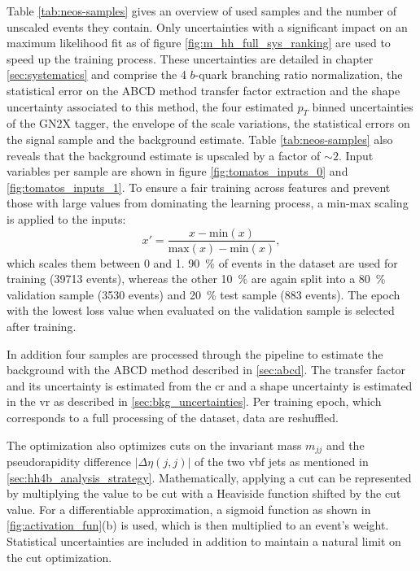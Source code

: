 Table \ref{tab:neos-samples} gives an overview of used samples and the number of unscaled events they contain. Only uncertainties with a significant impact on an \mhh{} maximum likelihood fit as of figure \ref{fig:m_hh_full_sys_ranking} are used to speed up the training process. These uncertainties are detailed in chapter \ref{sec:systematics} and comprise the 4 $b$-quark branching ratio normalization, the statistical error on the ABCD method transfer factor extraction and the shape uncertainty associated to this method, the four estimated $p_T$ binned uncertainties of the GN2X tagger, the envelope of the scale variations, the statistical errors on the \ktwov signal sample and the background estimate. Table \ref{tab:neos-samples} also reveals that the background estimate is upscaled by a factor of $\sim 2$. Input variables per sample are shown in figure \ref{fig:tomatos_inputs_0} and \ref{fig:tomatos_inputs_1}. To ensure a fair training across features and prevent those with large values from dominating the learning process, a min-max scaling is applied to the inputs:
\begin{equation}
    x'=\frac{x - \text{min}(x)}{\text{max}(x)-\text{min}(x)},
\end{equation}
which scales them between 0 and 1. \qty[]{90}{\percent} of events in the dataset are used for training (39713 events), whereas the other \qty[]{10}{\percent} are again split into a \qty[]{80}{\percent} validation sample (3530 events) and \qty[]{20}{\percent} test sample (883 events). The epoch with the lowest loss value when evaluated on the validation sample is selected after training.

In addition four samples are processed through the pipeline to estimate the background with the ABCD method described in \ref{sec:abcd}. The transfer factor and its uncertainty is estimated from the \ac{cr} and a shape uncertainty is estimated in the \ac{vr} as described in \ref{sec:bkg_uncertainties}. Per training epoch, which corresponds to a full processing of the dataset, data are reshuffled.

The optimization also optimizes cuts on the invariant mass $m_{jj}$ and the pseudorapidity difference $|\Delta\eta(j,j)|$ of the two \ac{vbf} jets as mentioned in \ref{sec:hh4b_analysis_strategy}. Mathematically, applying a cut can be represented by multiplying the value to be cut with a Heaviside function shifted by the cut value. For a differentiable approximation, a sigmoid function as shown in \ref{fig:activation_fun}(b) is used, which is then multiplied to an event's weight. Statistical uncertainties are included in addition to maintain a natural limit on the cut optimization.


